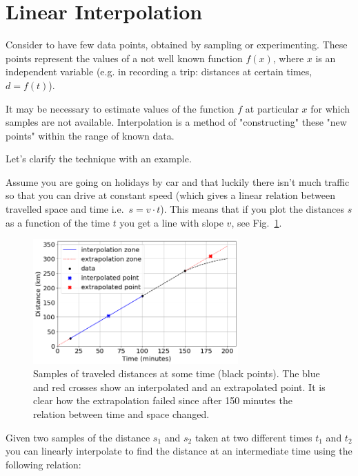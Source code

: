 \section{Linear Interpolation}
\label{linear-interpolation}

Consider to have few data points, obtained by sampling or experimenting. These points represent the values of a not well known function $f(x)$, where $x$ is an independent variable (e.g. in recording a trip: distances at certain times, $d = f(t)$).

It may be necessary to estimate values of the function $f$ at particular $x$ for which samples are not available. Interpolation is a method of "constructing" these "new points" within the range of known data.

Let's clarify the technique with an example.

Assume you are going on holidays by car and that luckily there isn't much traffic so that you can drive at constant speed (which gives a linear relation between travelled space and time i.e.~$s = v \cdot t$). This means that if you plot the distances $s$ as a function of the time $t$ you get a line with slope $v$, see Fig.~\ref{fig:samples_for_interpolation}.

\begin{figure}[hb]
  \centering
  \includegraphics[width=0.7\textwidth]{figures/interp_example1.png}
  \caption{Samples of traveled distances at some time (black points). The blue and red crosses show an interpolated and an extrapolated point. It is clear how the extrapolation failed since after 150 minutes the relation between time and space changed.}
  \label{fig:samples_for_interpolation}
\end{figure}

Given two samples of the distance $s_1$ and $s_2$ taken at two different times $t_1$ and $t_2$ you can linearly interpolate to find the distance at an intermediate time using the following relation:

